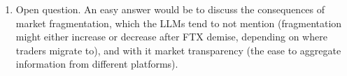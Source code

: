 \documentclass[a4paper]{article}
\newif\ifsolutions
\begin{document}
\begin{enumerate}
	
	\item Open question. An easy answer would be to discuss the consequences of market fragmentation, which the LLMs tend to not mention (fragmentation might either increase or decrease after FTX demise, depending on where traders migrate to), and with it market transparency (the ease to aggregate information from different platforms).
\end{enumerate}

\fi


{\ifsolutions \else	
	
\fi}
\end{document}
